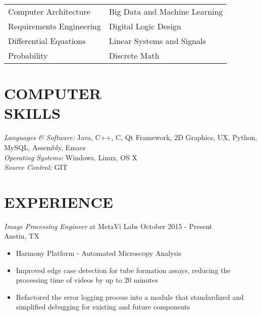 \documentclass[line,margin]{res}
\begin{document}
\begin{resume}
\begin{tabularx}{\textwidth}{@{}XX@{}}
                  Computer Architecture & Big Data and Machine Learning\\

                  Requirements Engineering & Digital Logic Design \\

                  Differential Equations & Linear Systems and Signals \\

                  Probability & Discrete Math \\

                \end{tabularx}


                


                
 
\section{COMPUTER \\ SKILLS} {\sl Languages \& Software:} Java, C++, C, Qt Framework, 2D Graphics, UX, Python, MySQL, Assembly, Emacs \\
        {\sl Operating Systems:} Windows, Linux, OS X \\
        {\sl Source Control:} GIT
 
        \section{EXPERIENCE} {\sl Image Processing Engineer} at MetaVi Labs \hfill October 2015 - Present \\
        Austin, TX 


        \begin{itemize}  \itemsep -2pt %
        \item         Harmony Platform - Automated Microscopy Analysis
                \item Improved edge case detection for tube formation assays, reducing the processing time of videos by up to 20 minutes
                \item Refactored the error logging process into a module that standardized and simplified debugging for existing and future components
                \end{itemize}
                

\end{resume}
\end{document}
